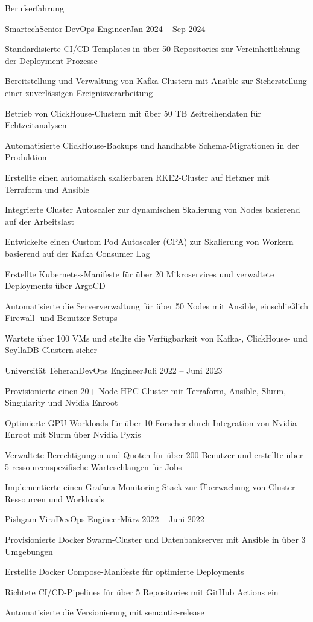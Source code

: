 \documentclass[]{main}
\begin{document}
\begin{section}{Berufserfahrung}
 \begin{subsection}{Smartech}{Senior DevOps Engineer}{Jan 2024 -- Sep 2024}{}
     \item Standardisierte CI/CD-Templates in über 50 Repositories zur Vereinheitlichung der Deployment-Prozesse
     \item Bereitstellung und Verwaltung von Kafka-Clustern mit Ansible zur Sicherstellung einer zuverlässigen Ereignisverarbeitung
     \item Betrieb von ClickHouse-Clustern mit über 50 TB Zeitreihendaten für Echtzeitanalysen
     \item Automatisierte ClickHouse-Backups und handhabte Schema-Migrationen in der Produktion
     \item Erstellte einen automatisch skalierbaren RKE2-Cluster auf Hetzner mit Terraform und Ansible
     \item Integrierte Cluster Autoscaler zur dynamischen Skalierung von Nodes basierend auf der Arbeitslast
     \item Entwickelte einen Custom Pod Autoscaler (CPA) zur Skalierung von Workern basierend auf der Kafka Consumer Lag
     \item Erstellte Kubernetes-Manifeste für über 20 Mikroservices und verwaltete Deployments über ArgoCD
     \item Automatisierte die Serververwaltung für über 50 Nodes mit Ansible, einschließlich Firewall- und Benutzer-Setups
     \item Wartete über 100 VMs und stellte die Verfügbarkeit von Kafka-, ClickHouse- und ScyllaDB-Clustern sicher
 \end{subsection}

 \begin{subsection}{Universität Teheran}{DevOps Engineer}{Juli 2022 -- Juni 2023}{}
     \item Provisionierte einen 20+ Node HPC-Cluster mit Terraform, Ansible, Slurm, Singularity und Nvidia Enroot
     \item Optimierte GPU-Workloads für über 10 Forscher durch Integration von Nvidia Enroot mit Slurm über Nvidia Pyxis
     \item Verwaltete Berechtigungen und Quoten für über 200 Benutzer und erstellte über 5 ressourcenspezifische Warteschlangen für Jobs
     \item Implementierte einen Grafana-Monitoring-Stack zur Überwachung von Cluster-Ressourcen und Workloads
 \end{subsection}

 \begin{subsection}{Pishgam Vira}{DevOps Engineer}{März 2022 -- Juni 2022}{}
     \item Provisionierte Docker Swarm-Cluster und Datenbankserver mit Ansible in über 3 Umgebungen
     \item Erstellte Docker Compose-Manifeste für optimierte Deployments
     \item Richtete CI/CD-Pipelines für über 5 Repositories mit GitHub Actions ein
     \item Automatisierte die Versionierung mit semantic-release
 \end{subsection}


\end{section}
\end{document}
